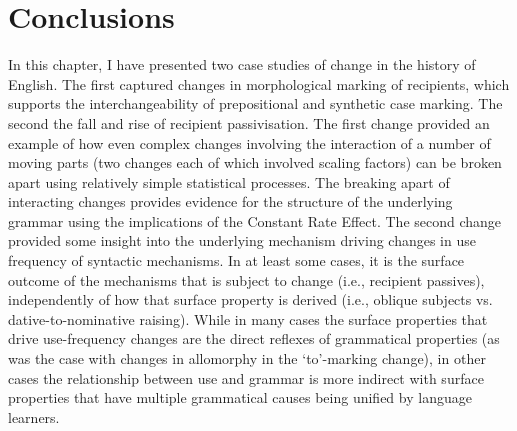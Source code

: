 \section{Conclusions}
	In this chapter, I have presented two case studies of change in the history of English. The first captured changes in morphological marking of recipients, which supports the interchangeability of prepositional and synthetic case marking. The second the fall and rise of recipient passivisation. The first change provided an example of how even complex changes involving the interaction of a number of moving parts (two changes each of which involved scaling factors) can be broken apart using relatively simple statistical processes. The breaking apart of interacting changes provides evidence for the structure of the underlying grammar using the implications of the Constant Rate Effect. The second change provided some insight into the underlying mechanism driving changes in use frequency of syntactic mechanisms. In at least some cases, it is the surface outcome of the mechanisms that is subject to change (i.e., recipient passives), independently of how that surface property is derived (i.e., oblique subjects vs. dative-to-nominative raising). While in many cases the surface properties that drive use-frequency changes are the direct reflexes of grammatical properties (as was the case with changes in allomorphy in the `to'-marking change), in other cases the relationship between use and grammar is more indirect with surface properties that have multiple grammatical causes being unified by language learners.

%

